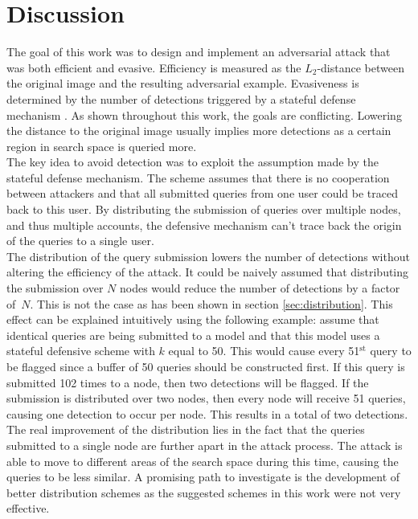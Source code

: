 \chapter{Discussion}\label{chap:discussion}
The goal of this work was to design and implement an adversarial attack that was both efficient and evasive. Efficiency is measured as the $L_2$-distance between the original image and the resulting adversarial example. Evasiveness is determined by the number of detections triggered by a stateful defense mechanism \cite{chen_stateful_2019}. As shown throughout this work, the goals are conflicting. Lowering the distance to the original image usually implies more detections as a certain region in search space is queried more.\\

The key idea to avoid detection was to exploit the assumption made by the stateful defense mechanism. The scheme assumes that there is no cooperation between attackers and that all submitted queries from one user could be traced back to this user. By distributing the submission of queries over multiple nodes, and thus multiple accounts, the defensive mechanism can't trace back the origin of the queries to a single user.\\

The distribution of the query submission lowers the number of detections without altering the efficiency of the attack. It could be naively assumed that distributing the submission over $N$ nodes would reduce the number of detections by a factor of~$N$. This is not the case as has been shown in section \ref{sec:distribution}. This effect can be explained intuitively using the following example: assume that identical queries are being submitted to a model and that this model uses a stateful defensive scheme with $k$ equal to 50. This would cause every 51$^{\text{st}}$ query to be flagged since a buffer of 50 queries should be constructed first. If this query is submitted 102 times to a node, then two detections will be flagged. If the submission is distributed over two nodes, then every node will receive 51 queries, causing one detection to occur per node. This results in a total of two detections. The real improvement of the distribution lies in the fact that the queries submitted to a single node are further apart in the attack process. The attack is able to move to different areas of the search space during this time, causing the queries to be less similar. A promising path to investigate is the development of better distribution schemes as the suggested schemes in this work were not very effective.\\

